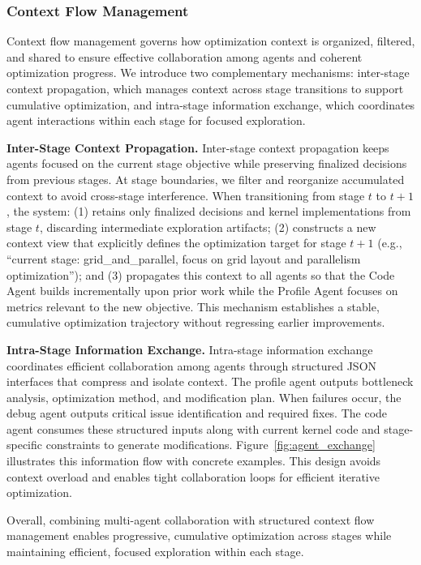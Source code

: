 \documentclass{article}
\theoremstyle{plain}
\theoremstyle{definition}
\theoremstyle{remark}
\begin{document}
\subsubsection{Context Flow Management}
Context flow management governs how optimization context is organized, filtered, and shared to ensure effective collaboration among agents and coherent optimization progress. We introduce two complementary mechanisms: inter-stage context propagation, which manages context across stage transitions to support cumulative optimization, and intra-stage information exchange, which coordinates agent interactions within each stage for focused exploration.

\textbf{Inter-Stage Context Propagation.}
Inter-stage context propagation keeps agents focused on the current stage objective while preserving finalized decisions from previous stages. At stage boundaries, we filter and reorganize accumulated context to avoid cross-stage interference. When transitioning from stage $t$ to $t{+}1$, the system: (1) retains only finalized decisions and kernel implementations from stage $t$, discarding intermediate exploration artifacts; (2) constructs a new context view that explicitly defines the optimization target for stage $t{+}1$ (e.g., ``current stage: grid\_and\_parallel, focus on grid layout and parallelism optimization''); and (3) propagates this context to all agents so that the Code Agent builds incrementally upon prior work while the Profile Agent focuses on metrics relevant to the new objective. This mechanism establishes a stable, cumulative optimization trajectory without regressing earlier improvements.

\textbf{Intra-Stage Information Exchange.}
Intra-stage information exchange coordinates efficient collaboration among agents through structured JSON interfaces that compress and isolate context. The profile agent outputs bottleneck analysis, optimization method, and modification plan. When failures occur, the debug agent outputs critical issue identification and required fixes. The code agent consumes these structured inputs along with current kernel code and stage-specific constraints to generate modifications. Figure~\ref{fig:agent_exchange} illustrates this information flow with concrete examples. This design avoids context overload and enables tight collaboration loops for efficient iterative optimization.

Overall, combining multi-agent collaboration with structured context flow management enables progressive, cumulative optimization across stages while maintaining efficient, focused exploration within each stage.
\end{document}
